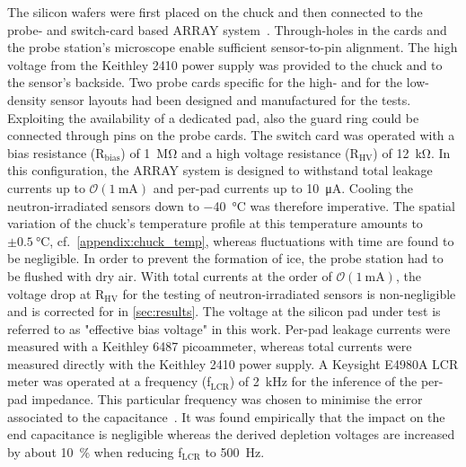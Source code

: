 The silicon wafers were first placed on the chuck and then connected to the probe- and switch-card based ARRAY system~\cite{pitters:array2019}.
Through-holes in the cards and the probe station's microscope  enable sufficient sensor-to-pin alignment. 
The high voltage from the Keithley 2410 power supply was provided to the chuck and to the sensor's backside.
Two probe cards specific for the high- and for the low-density sensor layouts had been designed and manufactured for the tests.
Exploiting the availability of a dedicated pad, also the guard ring could be connected through pins on the probe cards.
The switch card was operated with a bias resistance (R$_\text{bias}$) of \SI{1}{\mega\ohm} and a high voltage resistance (R$_\text{HV}$) of \SI{12}{\kilo\ohm}.
In this configuration, the ARRAY system is designed to withstand total leakage currents up to $\mathcal{O}(\SI{1}{\milli\ampere})$ and per-pad currents up to \SI{10}{\micro\ampere}.
Cooling the neutron-irradiated sensors down to \SI{-40}{\celsius} was therefore imperative.
The spatial variation of the chuck's temperature profile at this temperature amounts to $\pm\SI{0.5}{\celsius}$, cf.~\ref{appendix:chuck_temp}, whereas fluctuations with time are found to be negligible. 
In order to prevent the formation of ice, the probe station had to be flushed with dry air. 
With total currents at the order of $\mathcal{O}(\SI{1}{\milli\ampere})$, the voltage drop at R$_\text{HV}$ for the testing of neutron-irradiated sensors is non-negligible and is corrected for in \ref{sec:results}.
The voltage at the silicon pad under test is referred to as "effective bias voltage" in this work.
Per-pad leakage currents were measured with a Keithley 6487 picoammeter, whereas total currents were measured directly with the Keithley 2410 power supply.
A Keysight E4980A LCR meter was operated at a frequency (f$_\text{LCR}$) of \SI{2}{\kilo\hertz} for the inference of the per-pad impedance.
This particular frequency was chosen to minimise the error associated to the capacitance~\cite{pitters:array2019}.
It was found empirically that the impact on the end capacitance is negligible whereas the derived depletion voltages are increased by about \SI{10}{\percent} when reducing f$_\text{LCR}$ to \SI{500}{\hertz}. 

